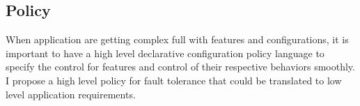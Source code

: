 \subsection{Policy}


When application are getting complex full with features and configurations, 
it is important to have a high level declarative configuration policy language 
to specify the control for features and control of their respective behaviors 
smoothly. I propose a high level policy for fault tolerance that could be
translated to low level application requirements.
